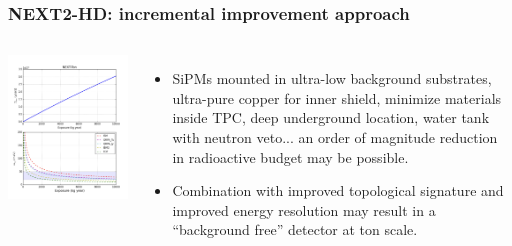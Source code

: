 \begin{frame}
\frametitle{NEXT2-HD: incremental improvement approach}

\begin{columns}
 
\includegraphics[scale=0.35]{moriond/next2-hd-sensi.png}
 

%   
 
\begin{itemize} 
\item SiPMs mounted in ultra-low background substrates, ultra-pure copper for inner shield, minimize materials inside TPC, deep underground location, water tank with neutron veto... an order of magnitude reduction in radioactive budget may be possible.   
\item Combination with improved topological signature and improved energy resolution may result in a ``background free'' detector at ton scale. 
\end{itemize}
\end{columns}
\end{frame}







